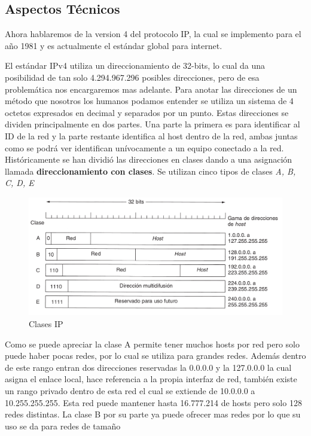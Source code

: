 \documentclass[11pt,a4paper]{article}
\begin{document}
\subsection{Aspectos Técnicos}
Ahora hablaremos de la version 4 del protocolo IP, la cual se implemento para el año 1981 y es 
actualmente el estándar global para internet.\par
El estándar IPv4 utiliza un direccionamiento de 32-bits, lo cual da una posibilidad de tan solo 
4.294.967.296 posibles direcciones, pero de esa problemática nos encargaremos mas adelante. Para 
anotar las direcciones de un método que nosotros los humanos podamos entender se utiliza un sistema 
de 4 octetos expresados en decimal y separados por un punto. Estas direcciones se dividen 
principalmente en dos partes. Una parte la primera es para identificar al ID de la red y la parte
restante identifica al host dentro de la red, ambas juntas como se podrá ver identifican 
unívocamente a un equipo conectado a la red. Históricamente se han dividió las direcciones en clases
dando a una asignación llamada \textbf{direccionamiento con clases}. Se utilizan cinco tipos de 
clases \emph{A, B, C, D, E}
\begin{figure}[h!]
 \centering
 \includegraphics[width=1\textwidth]{clasesIP.png}
 \caption[Clases IP]{Clases IP}
\end{figure}\par
Como se puede apreciar la clase A permite tener muchos hosts por red pero solo puede haber pocas 
redes, por lo cual se utiliza para grandes redes. Además dentro de este rango entran dos direcciones 
reservadas la 0.0.0.0 y la 127.0.0.0 la cual asigna el enlace local, hace referencia a la propia 
interfaz de red, también existe un rango privado dentro de esta red el cual se extiende de 10.0.0.0 
a 10.255.255.255. Esta red puede mantener hasta 16.777.214 de hosts pero solo 128 redes distintas.
La clase B por su parte ya puede ofrecer mas redes por lo que su uso se da para redes de tamaño 
\end{document}
